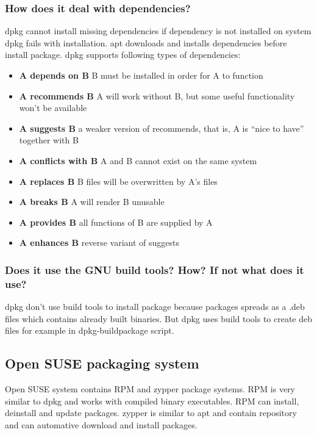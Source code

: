 \documentclass[a4paper,11pt]{article}
\begin{document}
\subsubsection{How does it deal with dependencies?}
dpkg cannot install missing dependencies if dependency is not installed on system dpkg fails with installation. apt downloads and installs dependencies before install package. dpkg supports following types of dependencies:

\begin{itemize}
  \item \textbf{A depends on B} B must be installed in order for A to function
  \item \textbf{A recommends B} A will work without B, but some useful functionality won’t be available
\item \textbf{A suggests B} a weaker version of recommends, that is, A is “nice to have” together with B
\item \textbf{A conflicts with B} A and B cannot exist on the same system
\item \textbf{A replaces B} B files will be overwritten by A’s files
\item \textbf{A breaks B} A will render B unusable
\item \textbf{A provides B} all functions of B are supplied by A
\item \textbf{A enhances B} reverse variant of suggests
\end{itemize}

\subsubsection{Does it use the GNU build tools? How? If not what does it use?}
dpkg don't use build tools to install package because packages spreads as a .deb files which contains already built binaries. But dpkg uses build tools to create deb files for example in dpkg-buildpackage script. 

\subsection{Open SUSE packaging system}

Open SUSE system contains RPM and zypper package systems. RPM is very similar to dpkg and works with compiled binary executables. RPM can install, deinstall and update packages. zypper is similar to apt and contain repository and can automative download and install packages.
\end{document}
